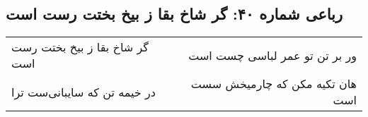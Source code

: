 \begin{center}
\section*{رباعی شماره ۴۰: گر شاخ بقا ز بیخ بختت رست است}
\label{sec:sh040}
\begin{longtable}{l p{0.5cm} r}
گر شاخ بقا ز بیخ بختت رست است
&&
ور بر تن تو عمر لباسی چست است
\\
در خیمه تن که سایبانی‌ست ترا
&&
هان تکیه مکن که چارمیخش سست است
\\
\end{longtable}
\end{center}
